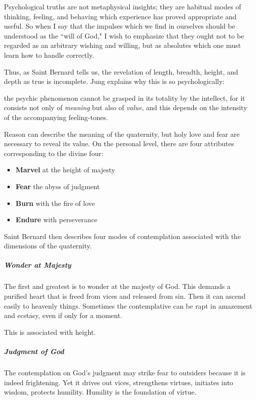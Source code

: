 \begin{quotex}
Psychological truths are not metaphysical insights; they are habitual modes of thinking, feeling, and behaving which experience has proved appropriate and useful. So when I say that the impulses which we find in ourselves should be understood as the ``will of God," I wish to emphasize that they ought not to be regarded as an arbitrary wishing and willing, but as absolutes which one must learn how to handle correctly. 

\end{quotex}
Thus, as Saint Bernard tells us, the revelation of length, breadth, height, and depth as true is incomplete. Jung explains why this is so psychologically:

\begin{quotex}
the psychic phenomenon cannot be grasped in its totality by the intellect, for it consists not only of \emph{meaning} but also of \emph{value}, and this depends on the intensity of the accompanying feeling-tones. 

\end{quotex}
Reason can describe the meaning of the quaternity, but holy love and fear are necessary to reveal its value. On the personal level, there are four attributes corresponding to the divine four:

\begin{itemize}
\item \textbf{Marvel} at the height of majesty 
\item \textbf{Fear} the abyss of judgment 
\item \textbf{Burn} with the fire of love 
\item \textbf{Endure} with perseverance 
\end{itemize}
Saint Bernard then describes four modes of contemplation associated with the dimensions of the quaternity.

\subparagraph{Wonder at Majesty}
The first and greatest is to wonder at the majesty of God. This demands a purified heart that is freed from vices and released from sin. Then it can ascend easily to heavenly things. Sometimes the contemplative can be rapt in amazement and ecstasy, even if only for a moment.

This is associated with height.

\subparagraph{Judgment of God}
The contemplation on God's judgment may strike fear to outsiders because it is indeed frightening. Yet it drives out vices, strengthens virtues, initiates into wisdom, protects humility. Humility is the foundation of virtue.

